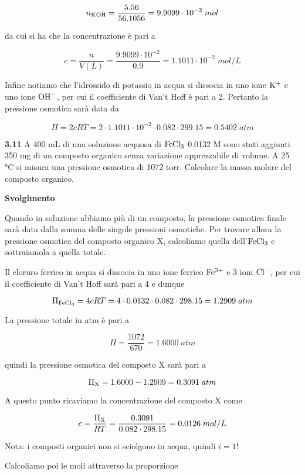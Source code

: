 $$n_{\rm KOH}=\frac{5.56}{56.1056}=9.9099 \cdot 10^{-2}\;mol$$

da cui si ha che la concentrazione è pari a

$$c=\frac{n}{V(L)}=\frac{9.9099 \cdot 10^{-2}}{0.9}=1.1011 \cdot 10^{-2}\;mol/L$$

Infine notiamo che l'idrossido di potassio in acqua si dissocia in uno ione $\rm K^+$ e uno ione $\rm OH^-$, per cui il coefficiente di Van't Hoff è pari a 2. Pertanto la pressione osmotica sarà data da

$$\Pi=2cRT
=2 \cdot 1.1011 \cdot 10^{-2} \cdot 0.082 \cdot 299.15
=0.5402\;atm$$

\vspace{0.2cm}\textbf{3.11} A 400 mL di una soluzione acquosa di $\rm FeCl_3$ 0.0132 M sono stati aggiunti 350 mg di un composto organico senza variazione apprezzabile di volume. A 25 °C si misura una pressione osmotica di 1072 torr. Calcolare la massa molare del composto organico.

\vspace{0.2cm}\large\textbf{Svolgimento}\normalsize

\vspace{0.2cm}Quando in soluzione abbiamo più di un composto, la pressione osmotica finale sarà data dalla somma delle singole pressioni osmotiche. Per trovare allora la pressione osmotica del composto organico X, calcoliamo quella dell'$\rm FeCl_3$ e sottraiamola a quella totale.

Il cloruro ferrico in acqua si dissocia in uno ione ferrico $\rm Fe^{3+}$ e 3 ioni $\rm Cl^-$, per cui il coefficiente di Van't Hoff sarà pari a 4 e dunque

$$\Pi_{\rm FeCl_3}=4cRT
=4 \cdot 0.0132 \cdot 0.082 \cdot 298.15
=1.2909\;atm$$

La pressione totale in atm è pari a

$$\Pi=\frac{1072}{670}=1.6000\;atm$$

quindi la pressione osmotica del composto X sarà pari a

$$\Pi_{\rm X}=1.6000 - 1.2909 = 0.3091\;atm$$

A questo punto ricaviamo la concentrazione del composto X come

$$c=\frac{\Pi_{\rm X}}{RT}=\frac{0.3091}{0.082 \cdot 298.15}
=0.0126\;mol/L$$

Nota: i composti organici non si sciolgono in acqua, quindi $i=1$!

Calcoliamo poi le moli attraverso la proporzione

